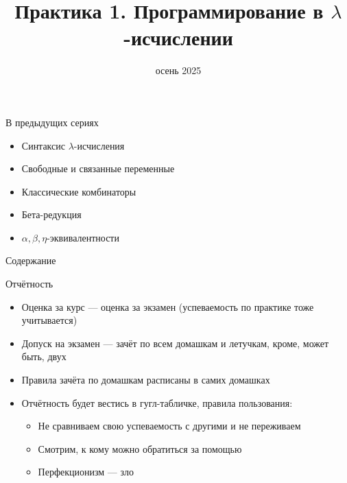 
\newif\ifhandout




\title[1. Программирование в $\lambda$-исчислении]{Практика 1. Программирование в $\lambda$-исчислении}
\date{осень 2025}



    \mymaketitle

    \begin{frame}{В предыдущих сериях}
        \begin{itemize}
            \item[\newtopic] Синтаксис $\lambda$-исчисления
            \item[\newtopic] Свободные и связанные переменные
            \item[\newtopic] Классические комбинаторы
            \item[\newtopic] Бета-редукция
            \item[\newtopic] $\alpha, \beta,\eta$-эквивалентности
        \end{itemize}
    \end{frame}

    \begin{frame}[noframenumbering]{Содержание}
        \tableofcontents
    \end{frame}


    \begin{frame}{Отчётность}
        \begin{itemize}
            \item Оценка за курс --- оценка за экзамен (успеваемость по практике тоже учитывается)
            \item Допуск на экзамен --- зачёт по всем домашкам и летучкам, кроме, может быть, двух
            \item Правила зачёта по домашкам расписаны в самих домашках
            \item Отчётность будет вестись в гугл-табличке, правила пользования:
            \begin{itemize}
                \item Не сравниваем свою успеваемость с другими и не переживаем
                \item Смотрим, к кому можно обратиться за помощью
                \item Перфекционизм --- зло
            \end{itemize}
        \end{itemize}
    \end{frame}

